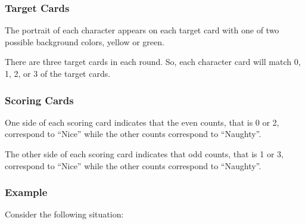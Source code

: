 \documentclass[11pt, parskip=half]{scrartcl}
\begin{document}
\subsubsection*{Target Cards}
The portrait of each character appears on each target card with one of two possible background colors, yellow or green.

There are three target cards in each round. So, each character card will match 0, 1, 2, or 3 of the target cards.

\subsubsection*{Scoring Cards}

One side of each scoring card indicates that the even counts, that is 0 or 2, correspond to ``Nice'' while the other counts correspond to ``Naughty''.

The other side of each scoring card indicates that odd counts, that is 1 or 3, correspond to ``Nice'' while the other counts correspond to ``Naughty''.


\newpage

\subsubsection*{Example}
Consider the following situation:
\end{document}
